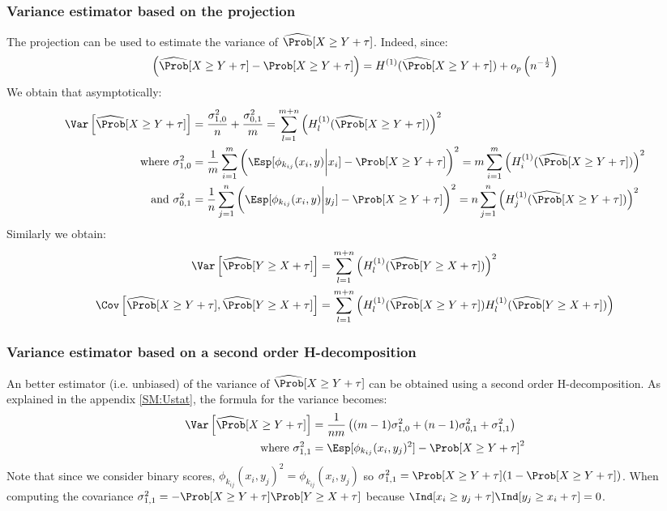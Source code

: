 \documentclass[12pt]{article}
\newcommand\half{\frac{1}{2}}
\begin{document}
\subsubsection{Variance estimator based on the \Hajek projection}
\label{sec:orga5f0fbc}

The \Hajek projection can be used to estimate the variance of \(\widehat{\Prob}[X \geq Y+\tau]\).
Indeed, since:
\begin{align*}
\left(\widehat{\Prob}[X \geq Y+\tau] - \Prob[X \geq Y+\tau] \right) = H^{(1)}(\widehat{\Prob}[X \geq Y + \tau]) + o_p \left( n^{-\half} \right)
\end{align*}
We obtain that asymptotically:
\begin{align*}
\Var\left[\widehat{\Prob}[X \geq Y+\tau]\right] &= \frac{\sigma_{1,0}^2}{n} + \frac{\sigma_{0,1}^2}{m} = \sum_{l=1}^{m+n} \left(H^{(1)}_l(\widehat{\Prob}[X \geq Y + \tau]) \right)^2 \\
\text{where } \sigma_{1,0}^2 &= \frac{1}{m}\sum_{i=1}^m \left(\Esp[\phi_{k_{ij}}(x_i,y) \bigg| x_i]-\Prob[X \geq Y+\tau]\right)^2 = m\sum_{i=1}^m \left(H^{(1)}_i(\widehat{\Prob}[X \geq Y + \tau]) \right)^2 \\
\text{and   } \sigma_{0,1}^2 &= \frac{1}{n}\sum_{j=1}^n \left(\Esp[\phi_{k_{ij}}(x_i,y) \bigg| y_j]-\Prob[X \geq Y+\tau] \right)^2 = n\sum_{j=1}^n \left(H^{(1)}_j(\widehat{\Prob}[X \geq Y + \tau]) \right)^2
\end{align*}
Similarly we obtain:
\begin{align*}
\Var\left[\widehat{\Prob}[Y \geq X+\tau]\right] &= \sum_{l=1}^{m+n} \left(H^{(1)}_l(\widehat{\Prob}[Y \geq X + \tau]) \right)^2 \\
\Cov\left[\widehat{\Prob}[X \geq Y+\tau],\widehat{\Prob}[Y \geq X+\tau]\right] &= \sum_{l=1}^{m+n} \left(H^{(1)}_l(\widehat{\Prob}[X \geq Y + \tau])H^{(1)}_l(\widehat{\Prob}[Y \geq X + \tau]) \right) \\
\end{align*}

\subsubsection{Variance estimator based on a second order H-decomposition}
\label{sec:org0c1727d}

An better estimator (i.e. unbiased) of the variance of
\(\widehat{\Prob}[X \geq Y+\tau]\) can be obtained using a second
order H-decomposition. As explained in the appendix \ref{SM:Ustat}, the
formula for the variance becomes:
\begin{align*}
\Var\left[\widehat{\Prob}[X \geq Y+\tau]\right] &= \frac{1}{nm} \left((m-1)\sigma_{1,0}^2 + (n-1)\sigma_{0,1}^2 + \sigma_{1,1}^2\right) \\
\text{where } \sigma_{1,1}^2 &= \Esp[\phi_{k_{ij}}(x_i,y_j)^2] - \Prob[X \geq Y+\tau]^2
\end{align*}
Note that since we consider binary scores,
\(\phi_{k_{ij}}(x_i,y_j)^2=\phi_{k_{ij}}(x_i,y_j)\) so
\(\sigma_{1,1}^2=\Prob[X \geq Y+\tau](1-\Prob[X \geq Y+\tau])\). When
computing the covariance \(\sigma_{1,1}^2 = -\Prob[X \geq
Y+\tau]\Prob[Y \geq X+\tau]\) because \(\Ind[x_i \geq y_j +
\tau]\Ind[y_j \geq x_i + \tau]=0\).
\end{document}
